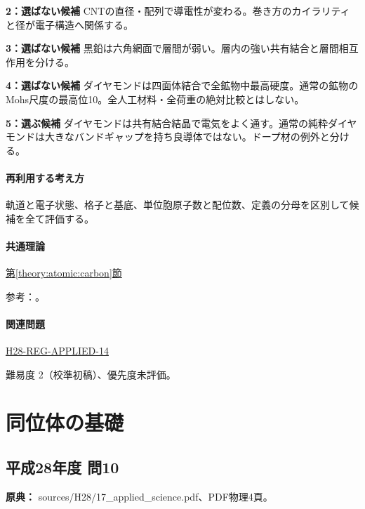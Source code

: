 \noindent\textbf{2：選ばない候補} CNTの直径・配列で導電性が変わる。巻き方のカイラリティと径が電子構造へ関係する。\par

\noindent\textbf{3：選ばない候補} 黒鉛は六角網面で層間が弱い。層内の強い共有結合と層間相互作用を分ける。\par

\noindent\textbf{4：選ばない候補} ダイヤモンドは四面体結合で全鉱物中最高硬度。通常の鉱物のMohs尺度の最高位10。全人工材料・全荷重の絶対比較とはしない。\par

\noindent\textbf{5：選ぶ候補} ダイヤモンドは共有結合結晶で電気をよく通す。通常の純粋ダイヤモンドは大きなバンドギャップを持ち良導体ではない。ドープ材の例外と分ける。\par

\paragraph{再利用する考え方} 軌道と電子状態、格子と基底、単位胞原子数と配位数、定義の分母を区別して候補を全て評価する。

\paragraph{共通理論} \hyperref[theory:atomic:carbon]{第\ref*{theory:atomic:carbon}節}

\par 参考：\cite{atomic_cnt,atomic_diamond}。

\paragraph{関連問題} \hyperref[q:h28-reg-applied-14]{H28-REG-APPLIED-14}

\par 難易度 2（校準初稿）、優先度未評価。

\section{同位体の基礎}

\subsection{平成28年度 問10}
\label{q:h28-reg-applied-10}

\noindent\textbf{原典：} sources/H28/17\_applied\_science.pdf、PDF物理4頁。

